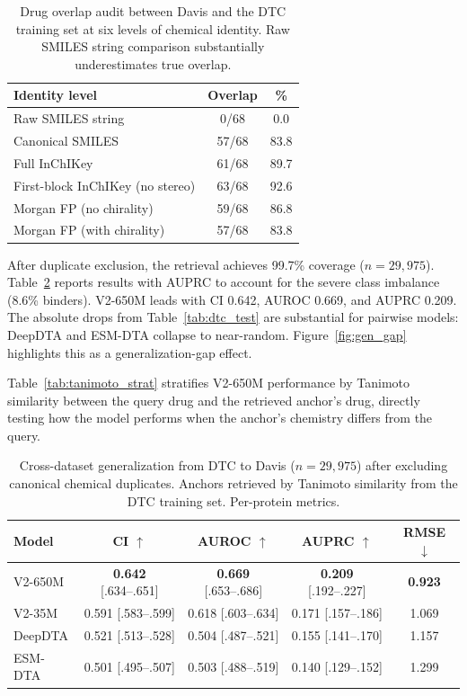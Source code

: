 \begin{table}[t]
\centering
\caption{Drug overlap audit between Davis and the DTC training set at six levels of chemical identity. Raw SMILES string comparison substantially underestimates true overlap.}
\label{tab:overlap_audit}
\small
\begin{tabular}{lcc}
\toprule
Identity level & Overlap & \% \\
\midrule
Raw SMILES string & 0/68 & 0.0 \\
Canonical SMILES & 57/68 & 83.8 \\
Full InChIKey & 61/68 & 89.7 \\
First-block InChIKey (no stereo) & 63/68 & 92.6 \\
Morgan FP (no chirality) & 59/68 & 86.8 \\
Morgan FP (with chirality) & 57/68 & 83.8 \\
\bottomrule
\end{tabular}
\end{table}

After duplicate exclusion, the retrieval achieves 99.7\% coverage ($n=29{,}975$). Table~\ref{tab:davis_cross_dataset} reports results with AUPRC to account for the severe class imbalance (8.6\% binders). V2-650M leads with CI 0.642, AUROC 0.669, and AUPRC 0.209. The absolute drops from Table~\ref{tab:dtc_test} are substantial for pairwise models: DeepDTA and ESM-DTA collapse to near-random. Figure~\ref{fig:gen_gap} highlights this as a generalization-gap effect.

Table~\ref{tab:tanimoto_strat} stratifies V2-650M performance by Tanimoto similarity between the query drug and the retrieved anchor's drug, directly testing how the model performs when the anchor's chemistry differs from the query.

\begin{table}[t]
\centering
\caption{Cross-dataset generalization from DTC to Davis ($n=29{,}975$) after excluding canonical chemical duplicates. Anchors retrieved by Tanimoto similarity from the DTC training set. Per-protein metrics.}
\label{tab:davis_cross_dataset}
\small
\begin{tabular}{lcccc}
\toprule
Model & CI $\uparrow$ & AUROC $\uparrow$ & AUPRC $\uparrow$ & RMSE $\downarrow$ \\
\midrule
V2-650M & \textbf{0.642} {\scriptsize [.634--.651]} & \textbf{0.669} {\scriptsize [.653--.686]} & \textbf{0.209} {\scriptsize [.192--.227]} & \textbf{0.923} \\
V2-35M  & 0.591 {\scriptsize [.583--.599]} & 0.618 {\scriptsize [.603--.634]} & 0.171 {\scriptsize [.157--.186]} & 1.069 \\
DeepDTA & 0.521 {\scriptsize [.513--.528]} & 0.504 {\scriptsize [.487--.521]} & 0.155 {\scriptsize [.141--.170]} & 1.157 \\
ESM-DTA & 0.501 {\scriptsize [.495--.507]} & 0.503 {\scriptsize [.488--.519]} & 0.140 {\scriptsize [.129--.152]} & 1.299 \\
\bottomrule
\end{tabular}
\end{table}


